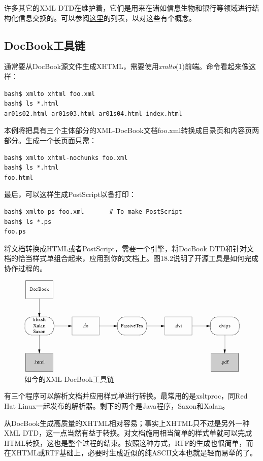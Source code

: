 \documentclass[12pt,oneside]{book}
\begin{document}
许多其它的XML DTD在维护着，它们是用来在诸如信息生物和银行等领域进行结构化信息交换的。可以参阅\href{http://www.xml.com/pub/rg/DTD_Repositories}{这里}的列表，以对这些有个概念。

\subsection{DocBook工具链}
通常要从DocBook源文件生成XHTML，需要使用\textit{xmlto}(1)前端。命令看起来像这样：
\begin{Verbatim}
bash$ xmlto xhtml foo.xml
bash$ ls *.html
ar01s02.html ar01s03.html ar01s04.html index.html
\end{Verbatim}

本例将把具有三个主体部分的XML-DocBook文档foo.xml转换成目录页和内容页两部分。生成一个长页面只需：
\begin{Verbatim}
bash$ xmlto xhtml-nochunks foo.xml
bash$ ls *.html
foo.html
\end{Verbatim}

最后，可以这样生成PostScript以备打印：
\begin{Verbatim}
bash$ xmlto ps foo.xml       # To make PostScript
bash$ ls *.ps
foo.ps
\end{Verbatim}

将文档转换成HTML或者PostScript，需要一个引擎，将DocBook DTD和针对文档的恰当样式单组合起来，应用到你的文档上。图18.2说明了开源工具是如何完成协作过程的。

\begin{figure}[H]
\centering
\includegraphics[width=\linewidth ,totalheight=0.95\textheight , keepaspectratio]{docflow2.png}
\caption{如今的XML-DocBook工具链}
\end{figure}


有三个程序可以解析文档并应用样式单进行转换。最常用的是xsltproc，同Red Hat Linux一起发布的解析器。剩下的两个是Java程序，Saxon和Xalan。

从DocBook生成高质量的XHTML相对容易；事实上XHTML只不过是另外一种XML DTD，这一点当然有益于转换。对文档施用相当简单的样式单就可以完成HTML转换，这也是整个过程的结束。按照这种方式，RTF的生成也很简单，而在XHTML或RTF基础上，必要时生成近似的纯ASCII文本也就是轻而易举的了。
\end{document}
